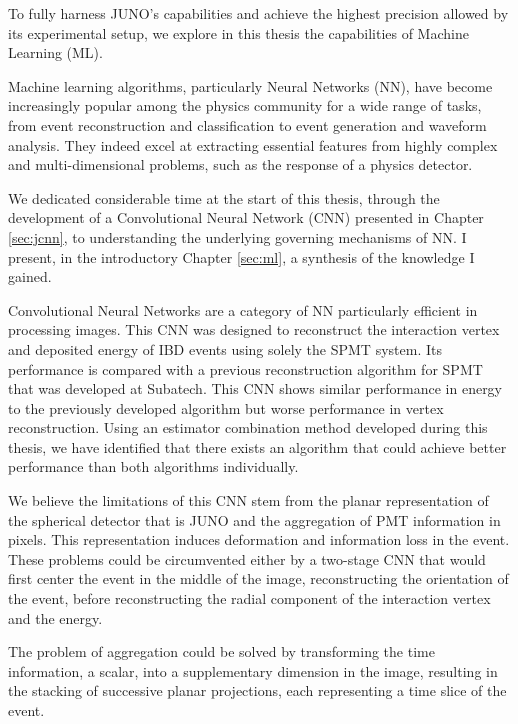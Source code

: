 \documentclass[../main.tex]{subfiles}
\begin{document}
\hfill

To fully harness JUNO's capabilities and achieve the highest precision allowed by its experimental setup, we explore in this thesis the capabilities of Machine Learning (ML).

Machine learning algorithms, particularly Neural Networks (NN), have become increasingly popular among the physics community for a wide range of tasks, from event reconstruction and classification to event generation and waveform analysis. They indeed excel at extracting essential features from highly complex and multi-dimensional problems, such as the response of a physics detector.

We dedicated considerable time at the start of this thesis, through the development of a Convolutional Neural Network (CNN) presented in Chapter \ref{sec:jcnn}, to understanding the underlying governing mechanisms of NN. I present, in the introductory Chapter \ref{sec:ml}, a synthesis of the knowledge I gained.

Convolutional Neural Networks are a category of NN particularly efficient in processing images. This CNN was designed to reconstruct the interaction vertex and deposited energy of IBD events using solely the SPMT system. Its performance is compared with a previous reconstruction algorithm for SPMT that was developed at Subatech. This CNN shows similar performance in energy to the previously developed algorithm but worse performance in vertex reconstruction. Using an estimator combination method developed during this thesis, we have identified that there exists an algorithm that could achieve better performance than both algorithms individually.

We believe the limitations of this CNN stem from the planar representation of the spherical detector that is JUNO and the aggregation of PMT information in pixels. This representation induces deformation and information loss in the event. These problems could be circumvented either by a two-stage CNN that would first center the event in the middle of the image, reconstructing the orientation of the event, before reconstructing the radial component of the interaction vertex and the energy.

The problem of aggregation could be solved by transforming the time information, a scalar, into a supplementary dimension in the image, resulting in the stacking of successive planar projections, each representing a time slice of the event.


\hfill
\end{document}

